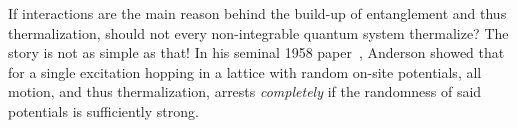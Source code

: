 
If interactions are the main reason behind the build-up of entanglement and thus thermalization, should not every non-integrable quantum system thermalize? The story is not as simple as that! 
In his seminal 1958 paper~\cite{andersonAbsenceDiffusionCertain1958}, Anderson showed that for a single excitation hopping in a lattice with random on-site potentials, all motion, and thus thermalization, arrests \emph{completely} if the randomness of said potentials is sufficiently strong.
